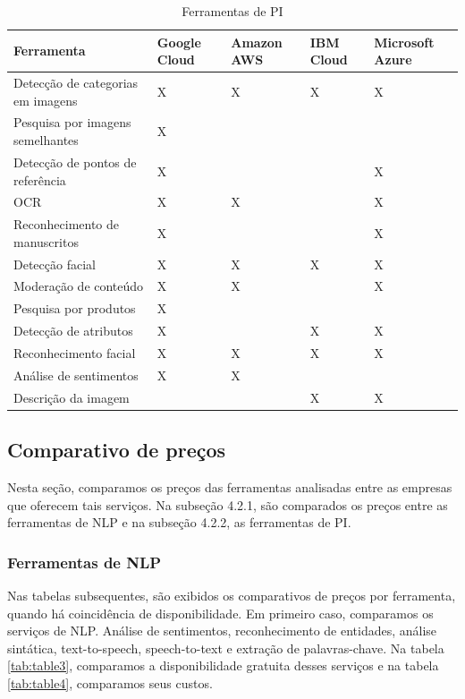 \documentclass{article}
\begin{document}
\begin{table}[!!ht]
 \caption{Ferramentas de PI}
  \centering
  \begin{tabular}{lllll}
    \cmidrule(r){1-5}
    Ferramenta & Google Cloud & Amazon AWS & IBM Cloud & Microsoft Azure \\
    \midrule
    Detecção de categorias em imagens & X & X & X & X \\
    Pesquisa por imagens semelhantes & X & & & \\
    Detecção de pontos de referência & X & & & X \\
    OCR & X & X & & X \\
    Reconhecimento de manuscritos & X & & & X \\
    Detecção facial & X & X & X & X \\
    Moderação de conteúdo & X & X & & X \\
    Pesquisa por produtos & X & & & \\
    Detecção de atributos & X & & X & X \\
    Reconhecimento facial & X & X & X & X \\
    Análise de sentimentos & X & X & &  \\
    Descrição da imagem & & & X & X \\
    \bottomrule
  \end{tabular}
  \label{tab:table2}
\end{table}

\subsection{Comparativo de preços}

Nesta seção, comparamos os preços das ferramentas analisadas entre as empresas que oferecem tais serviços. Na subseção 4.2.1, são comparados os preços entre as ferramentas de NLP e na subseção 4.2.2, as ferramentas de PI.

\subsubsection{Ferramentas de NLP}

Nas tabelas subsequentes, são exibidos os comparativos de preços por ferramenta, quando há coincidência de disponibilidade. Em primeiro caso, comparamos os serviços de NLP. Análise de sentimentos, reconhecimento de entidades, análise sintática, text-to-speech, speech-to-text e extração de palavras-chave. Na tabela \ref{tab:table3}, comparamos a disponibilidade gratuita desses serviços e na tabela \ref{tab:table4}, comparamos seus custos.
\end{document}
